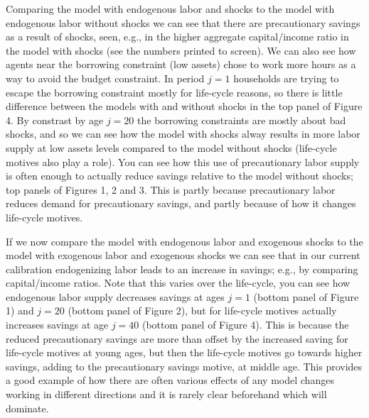 Comparing the model with endogenous labor and shocks to the model with endogenous labor without shocks we can see that there are precautionary savings as a result of shocks, seen, e.g., in the higher aggregate capital/income ratio in the model with shocks (see the numbers printed to screen). We can also see how agents near the borrowing constraint (low assets) chose to work more hours as a way to avoid the budget constraint. In period $j=1$ households are trying to escape the borrowing constraint mostly for life-cycle reasons, so there is little difference between the models with and without shocks in the top panel of Figure 4. By constrast by age $j=20$ the borrowing constraints are mostly about bad shocks, and so we can see how the model with shocks alway results in more labor supply at low assets levels compared to the model without shocks (life-cycle motives also play a role). You can see how this use of precautionary labor supply is often enough to actually reduce savings relative to the model without shocks; top panels of Figures 1, 2 and 3. This is partly because precautionary labor reduces demand for precautionary savings, and partly because of how it changes life-cycle motives.

If we now compare the model with endogenous labor and exogenous shocks to the model with exogenous labor and exogenous shocks we can see that in our current calibration endogenizing labor leads to an increase in savings; e.g., by comparing capital/income ratios. Note that this varies over the life-cycle, you can see how endogenous labor supply decreases savings at ages $j=1$ (bottom panel of Figure 1) and $j=20$ (bottom panel of Figure 2), but for life-cycle motives actually increases savings at age $j=40$ (bottom panel of Figure 4). This is because the reduced precautionary savings are more than offset by the increased saving for life-cycle motives at young ages, but then the life-cycle motives go towards higher savings, adding to the precautionary savings motive, at middle age. This provides a good example of how there are often various effects of any model changes working in different directions and it is rarely clear beforehand which will dominate.


